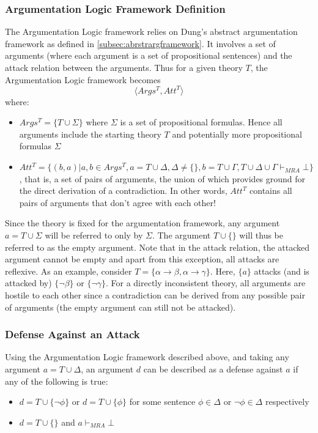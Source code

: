 \documentclass[11pt,twoside,a4paper]{report}
\begin{document}
\subsubsection{Argumentation Logic Framework Definition}
\label{subsec:alfdef}
The Argumentation Logic framework relies on Dung's abstract argumentation framework as defined in \autoref{subsec:abrstrargframework}. It involves a set of arguments (where each argument is a set of propositional sentences) and the attack relation between the arguments. Thus for a given theory $T$, the Argumentation Logic framework becomes
\[\langle Args^T, Att^T\rangle\]
where:
\begin{itemize}
\item
$Args^T = \{T\cup\Sigma\}$ where $\Sigma$ is a set of propositional formulas. Hence all arguments include the starting theory $T$ and potentially more propositional formulas $\Sigma$
\item
$Att^T = \{(b,a) | a,b \in Args^T, a = T\cup\Delta, \Delta\neq\{\}, b = T\cup\Gamma, T\cup\Delta\cup\Gamma\vdash_{MRA}\bot\}$, that is, a set of pairs of arguments, the union of which provides ground for the direct derivation of a contradiction. In other words, $Att^T$ contains all pairs of arguments that don't agree with each other!
\end{itemize}

Since the theory is fixed for the argumentation framework, any argument $a = T\cup\Sigma$  will be referred to only by $\Sigma$. The argument $T\cup\{\}$ will thus be referred to as the empty argument. Note that in the attack relation, the attacked argument cannot be empty and apart from this exception, all attacks are reflexive.
As an example, consider $T = \{\alpha\rightarrow\beta, \alpha\rightarrow\gamma\}$. Here, $\{a\}$ attacks (and is attacked by) $\{\neg\beta\}$ or $\{\neg\gamma\}$. For a directly inconsistent theory, all arguments are hostile to each other since a contradiction can be derived from any possible pair of arguments (the empty argument can still not be attacked).

\subsubsection{Defense Against an Attack}
\label{subsec:alfdef2}
Using the Argumentation Logic framework described above, and taking any argument $a = T\cup\Delta$, an argument $d$ can be described as a defense against $a$ if any of the following is true:
\begin{itemize}
\item
$d = T\cup\{\neg\phi\}$ or $d = T\cup\{\phi\}$ for some sentence $\phi\in\Delta$ or $\neg\phi\in\Delta$ respectively
\item
$d = T\cup\{\}$ and $a\vdash_{MRA}\bot$
\end{itemize}
\end{document}
